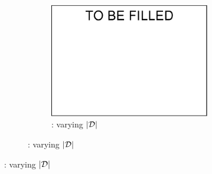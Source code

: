 {\begin{figure}[tb!]
\begin{subfigure}[b]{1.00\textwidth}
\begin{subfigure}[b]{0.245\textwidth}
\begin{center}
            \label{tpch-1-varyB} 
          \end{center}
          \vspace{-1ex}
        \end{subfigure}
  		\begin{subfigure}[b]{0.245\textwidth}
          \centering
          \includegraphics[width=1\textwidth]{fig/a.eps}
          \begin{center}
            \vspace{-2ex}\caption{\tpch: varying $|\mathcal D|$}
            \label{tpch-1-varyD} 
          \end{center}
          \vspace{-1ex}
        \end{subfigure}


\end{subfigure}
\end{figure}}
